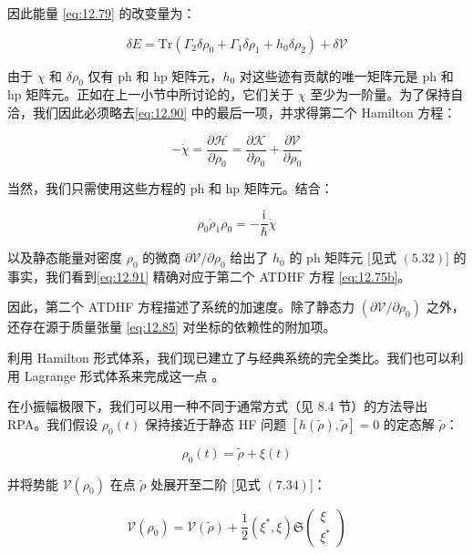 因此能量 \ref{eq:12.79} 的改变量为：

\begin{equation}
\delta E=\mathrm{Tr}(\Gamma_{2}\delta\rho_{0}+\Gamma_{1}\delta\rho_{1}+h_{0}\delta\rho_{2})+\delta\mathcal{V}\label{eq:12.90}
\end{equation}

由于 $\chi$ 和 $\delta\rho_{0}$ 仅有 ph 和 hp 矩阵元，$h_{0}$ 对这些迹有贡献的唯一矩阵元是
ph 和 hp 矩阵元。正如在上一小节中所讨论的，它们关于 $\chi$ 至少为一阶量。为了保持自洽，我们因此必须略去\ref{eq:12.90}
中的最后一项，并求得第二个 Hamilton 方程：

\begin{equation}
-\dot{\chi}=\frac{\partial\mathcal{H}}{\partial\rho_{0}}=\frac{\partial\mathcal{K}}{\partial\rho_{0}}+\frac{\partial\mathcal{V}}{\partial\rho_{0}}\label{eq:12.91}
\end{equation}

当然，我们只需使用这些方程的 ph 和 hp 矩阵元。结合：

\begin{equation}
\rho_{0}\dot{\rho}_{1}\rho_{0}=-\frac{\mathrm{i}}{\hbar}\dot{\chi}\label{eq:12.92}
\end{equation}

以及静态能量对密度 $\rho_{0}$ 的微商 $\partial\mathcal{V}/\partial\rho_{0}$
给出了 $h_{0}$ 的 ph 矩阵元 {[}见式 $(5.32)${]} 的事实，我们看到\ref{eq:12.91} 精确对应于第二个
ATDHF 方程 \ref{eq:12.75b}。

因此，第二个 ATDHF 方程描述了系统的加速度。除了静态力 $(\partial\mathcal{V}/\partial\rho_{0})$
之外，还存在源于质量张量 \ref{eq:12.85} 对坐标的依赖性的附加项。

利用 Hamilton 形式体系，我们现已建立了与经典系统的完全类比。我们也可以利用 Lagrange 形式体系来完成这一点 \cite{BV78}。

在小振幅极限下，我们可以用一种不同于通常方式（见 8.4 节）的方法导出 RPA。我们假设 $\rho_{0}(t)$ 保持接近于静态
HF 问题 $[h(\tilde{\rho}),\tilde{\rho}]=0$ 的定态解 $\tilde{\rho}$：

\begin{equation}
\rho_{0}(t)=\tilde{\rho}+\xi(t)\label{eq:12.93}
\end{equation}

并将势能 $\mathcal{V}(\rho_{0})$ 在点 $\tilde{\rho}$ 处展开至二阶 {[}见式 $(7.34)${]}：

\begin{equation}
\mathcal{V}(\rho_{0})=\mathcal{V}(\tilde{\rho})+\frac{1}{2}(\xi^{*},\xi)\mathfrak{S}\left(\begin{array}{c}
\xi\\
\xi^{*}
\end{array}\right)\label{eq:12.94}
\end{equation}

